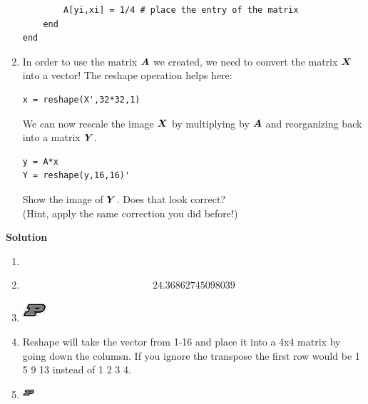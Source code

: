 \documentclass[]{article}
\begin{document}
\begin{enumerate}
\begin{verbatim}
        A[yi,xi] = 1/4 # place the entry of the matrix
    end
end
\end{verbatim}
\item
  In order to use the matrix \(\boldsymbol{A}\) we created, we need to convert the
  matrix \(\boldsymbol{X}\) into a vector! The reshape operation helps here:

\begin{verbatim}
x = reshape(X',32*32,1)
\end{verbatim}

  We can now rescale the image \(\boldsymbol{X}\) by multiplying by \(\boldsymbol{A}\) and
  reorganizing back into a matrix \(\boldsymbol{Y}\).

\begin{verbatim}
y = A*x
Y = reshape(y,16,16)'
\end{verbatim}

  Show the image of \(\boldsymbol{Y}\). Does that look correct?\\
  (Hint, apply the same correction you did before!)
\end{enumerate}

\textbf{Solution} 
\begin{enumerate}
\def\labelenumi{\arabic{enumi}.}
\item
\item
\[ 24.36862745098039 \]
\item 
\hfill \break
\includegraphics[keepaspectratio]{problem4partA.png}
\item
Reshape will take the vector from 1-16 and place it into a 4x4 matrix by going down the columsn. If you ignore the transpose the first row would be 1 5 9 13 instead of 1 2 3 4. 
\item
\hfill \break
\includegraphics[keepaspectratio]{problem4partD.png}
\end{enumerate}

\end{document}
